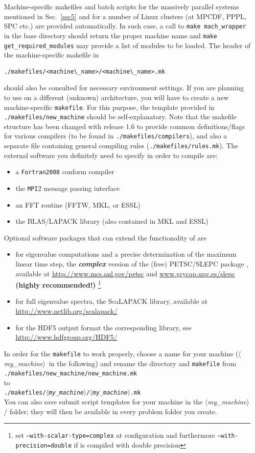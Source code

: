 \documentclass[12pt]{article}
\newcommand{\mach}{$\langle$\textsl{my\_machine}$\rangle$}
\begin{document}
Machine-specific makefiles and batch scripts for the massively parallel systems mentioned in Sec.~\ref{sec5} and for a
number of Linux clusters (at MPCDF, PPPL, SPC etc.) are provided automatically. In such case, a call to \texttt{make mach\_wrapper} in the \gene base directory should return the proper machine name and \texttt{make get\_required\_modules} may provide a list of modules to be loaded. The header of the machine-specific makefile in
\begin{verbatim}
./makefiles/<machine\_name>/<machine\_name>.mk
\end{verbatim}
should also be consulted for necessary environment settings.
If you are planning to use \gene on a different (unknown) architecture, you will have to create a new machine-specific
{\tt makefile}. For this purpose, the template provided in \texttt{./makefiles/new\_machine} should
be self-explanatory. Note that the makefile structure has been changed with release 1.6 to provide common
definitions/flags for various compilers (to be found in \texttt{./makefiles/compilers}), and also a separate
file containing general compiling rules (\texttt{./makefiles/rules.mk}).
The external software you definitely need to specify in order to compile \gene are:
\begin{itemize}
\item a {\tt Fortran2008} conform compiler
\item the {\tt MPI}2 message passing interface
\item an FFT routine (FFTW, MKL, or ESSL)
\item the BLAS/LAPACK library (also contained in MKL and ESSL)
\end{itemize}
Optional software packages that can extend the functionality of \gene are
\begin{itemize}
\item for eigenvalue computations and a precise determination of the maximum linear time step,
the {\bf \emph{complex}} version of the (free) PETSC/SLEPC package
\cite{petsc1,petsc2,slepc}, available at \url{http://www.mcs.anl.gov/petsc}
and \url{www.grycap.upv.es/slepc} {\bf (highly recommended!)}
\footnote{set {\tt --with-scalar-type=complex} at configuration and furthermore {\tt --with-precision=double} if \gene is compiled with double precision}
\item for full eigenvalue spectra, the ScaLAPACK library, available at \url{http://www.netlib.org/scalapack/}
\item for the HDF5 output format the corresponding library, see \url{http://www.hdfgroup.org/HDF5/}
\end{itemize}
In order for the {\tt makefile} to work properly, choose a name for
your machine (\mach\ in the following) and rename the directory and {\tt makefile} from\\
\texttt{./makefiles/new\_machine/new\_machine.mk}\\ to\\ \texttt{./makefiles/\mach/\mach.mk}\\
You can also save submit script templates for your machine in the \mach/ folder; they will then be
available in every problem folder you create.
\end{document}
